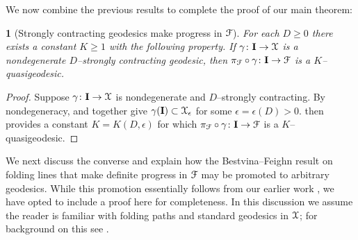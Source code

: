 \documentclass[letterpaper,fleqn]{article}
\theoremstyle{plain}
\newtheorem*{thm:main}{\Cref{thm:contraction_impies_progress}}
\theoremstyle{definition}
\newcommand{\factor}{{\EuScript F}} %
\newcommand{\fc}{\factor} %
\newcommand{\os}{{\EuScript X}} %
\newcommand{\X}{\os}
\newcommand{\fproj}{\pi_\fc} %
\newcommand{\I}{\mathbf{I}}
\begin{document}
We now combine the previous results to complete the proof of our main theorem:

\begin{thm:main}[Strongly contracting geodesics make progress in $\fc$]
For each $D\ge 0$ there exists a constant $K\ge 1$ with the following property. If $\gamma\colon \I\to \os$ is a nondegenerate $D$--strongly contracting geodesic, then $\fproj\circ\gamma\colon \I\to \fc$ is a $K$--quasigeodesic.
\end{thm:main}
\begin{proof}%
Suppose $\gamma\colon\I\to\os$ is nondegenerate and $D$--strongly contracting. By nondegeneracy,  and  together give $\gamma(\I)\subset\os_\epsilon$ for some $\epsilon = \epsilon(D) > 0$.  then provides a constant $K = K(D,\epsilon)$ for which $\fproj\circ\gamma\colon\I\to\fc$ is a $K$--quasigeodesic.
\end{proof}

We next discuss the converse  and explain how the Bestvina--Feighn result \cite[Corollary 7.3]{BFhyp} on folding lines that make definite progress in $\fc$ may be promoted to arbitrary geodesics. While this promotion essentially follows from our earlier work \cite{DT1}, we have opted to include a proof here for completeness. In this discussion we assume the reader is familiar with folding paths and standard geodesics in $\X$; for background on this see \cite{FMout, BFhyp, DT1}.
\end{document}
